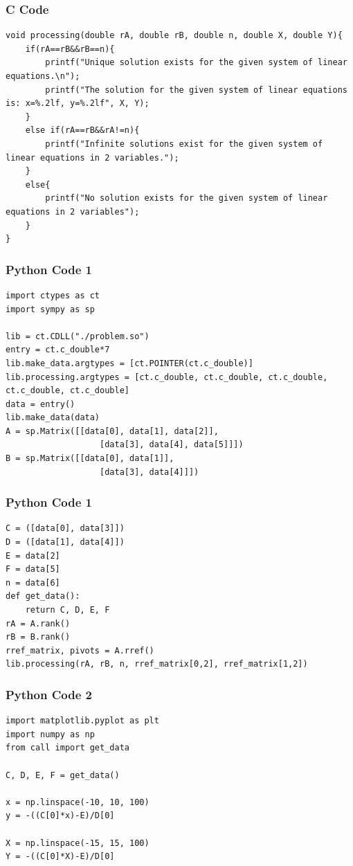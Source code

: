 \documentclass{beamer}
\begin{document}
\begin{frame}[fragile]
    \frametitle{C Code}
    \begin{lstlisting}
void processing(double rA, double rB, double n, double X, double Y){
    if(rA==rB&&rB==n){
        printf("Unique solution exists for the given system of linear equations.\n");
        printf("The solution for the given system of linear equations is: x=%.2lf, y=%.2lf", X, Y);
    }
    else if(rA==rB&&rA!=n){
        printf("Infinite solutions exist for the given system of linear equations in 2 variables.");
    }
    else{
        printf("No solution exists for the given system of linear equations in 2 variables");
    }
}
    \end{lstlisting}
\end{frame}


\begin{frame}[fragile]
    \frametitle{Python Code 1}
    \begin{lstlisting}
import ctypes as ct
import sympy as sp

lib = ct.CDLL("./problem.so")
entry = ct.c_double*7
lib.make_data.argtypes = [ct.POINTER(ct.c_double)]
lib.processing.argtypes = [ct.c_double, ct.c_double, ct.c_double, ct.c_double, ct.c_double]
data = entry()
lib.make_data(data)
A = sp.Matrix([[data[0], data[1], data[2]],
                   [data[3], data[4], data[5]]])
B = sp.Matrix([[data[0], data[1]],
                   [data[3], data[4]]])
    \end{lstlisting}
\end{frame}

\begin{frame}[fragile]
    \frametitle{Python Code 1}
    \begin{lstlisting}
C = ([data[0], data[3]])
D = ([data[1], data[4]])
E = data[2]
F = data[5]
n = data[6]
def get_data():
    return C, D, E, F
rA = A.rank()
rB = B.rank()
rref_matrix, pivots = A.rref()
lib.processing(rA, rB, n, rref_matrix[0,2], rref_matrix[1,2])
    \end{lstlisting}
\end{frame}

\begin{frame}[fragile]
    \frametitle{Python Code 2}
    \begin{lstlisting}
import matplotlib.pyplot as plt
import numpy as np
from call import get_data

C, D, E, F = get_data()

x = np.linspace(-10, 10, 100)
y = -((C[0]*x)-E)/D[0]

X = np.linspace(-15, 15, 100)
Y = -((C[0]*X)-E)/D[0]
    \end{lstlisting}
\end{frame}
\end{document}
